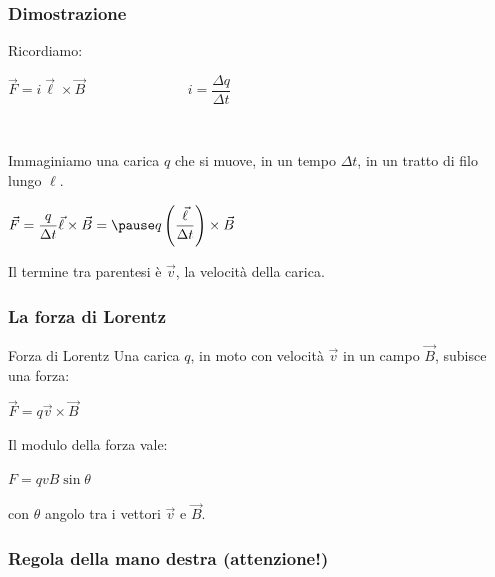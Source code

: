 \documentclass[]{beamer}
\theoremstyle{plain}
\begin{document}
\begin{frame}
\frametitle{Dimostrazione}
Ricordiamo:
\begin{center}
$ \vec{F} = i\vec{\ell}\times\vec{B} $\pause ~~~~~~~~~~~~~~ $ i = \dfrac{\Delta q}{\Delta t} $
\end{center}\pause

~

Immaginiamo una carica $ q $ che si muove, in un tempo $ \Delta t $, in un tratto di filo lungo $ \ell $.\pause
\begin{center}
$ \vec{F} = \dfrac{q}{\Delta t} \vec{\ell}\times\vec{B} =\pause q\left(\dfrac{\vec{\ell}}{\Delta t} \right)\times\vec{B} $ 
\end{center}\pause
Il termine tra parentesi è \alert<6>{$ \vec{v} $, la velocità della carica}.
\end{frame}


\begin{frame}
\frametitle{La forza di Lorentz}
\begin{block}{Forza di Lorentz}
Una carica $ q $, in moto con velocità $ \vec{v} $ in un campo $ \vec{B} $, subisce una forza:
\begin{center}
\colorbox{blue!30}{$ \vec{F} = q \vec{v} \times \vec{B} $}
\end{center}\pause
Il modulo della forza vale:
\begin{center}
$ F = qvB\sin\theta $
\end{center}
con $ \theta $ angolo tra i vettori $ \vec{v} $ e $ \vec{B} $.
\end{block}
\end{frame}



\begin{frame}
\frametitle{Regola della mano destra (attenzione!)}
\begin{columns}
\begin{column}{0.4\textwidth}
\end{column}
\begin{column}{0.4\textwidth}
\end{column}
\end{columns}
\end{frame}
\end{document}
